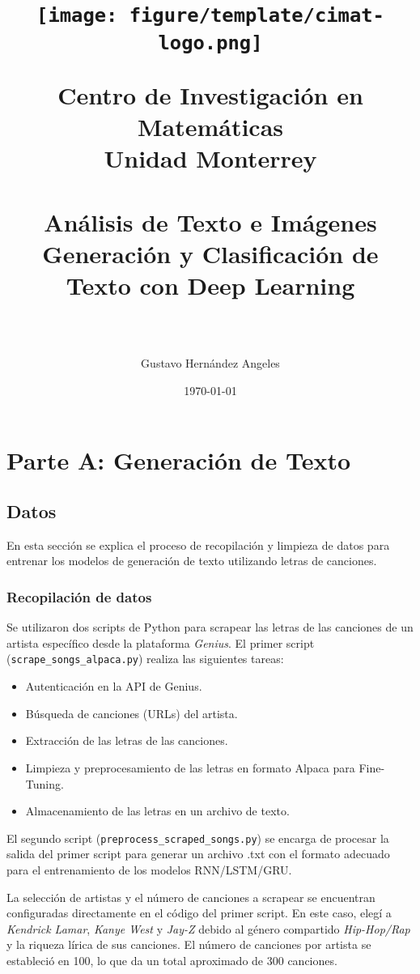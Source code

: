 \documentclass[paper=letter, fontsize=11pt, draft=false]{scrartcl}
\title{	
    \begin{center}
        \texttt{[image: figure/template/cimat-logo.png]} %
    \end{center}
    \vspace{0.5cm}
    \normalfont \normalsize 
    \textbf{\Large   Centro de Investigación en Matemáticas} \\
    \Large Unidad Monterrey \\ [25pt] 
    \horrule{1pt} \\[0.4cm] %
    \huge Análisis de Texto e Imágenes\\
    \Large Generación y Clasificación de Texto con Deep Learning\\ 
    \horrule{2pt} \\[0.5cm] %
}
\author{\large Gustavo Hernández Angeles}
\date{\normalsize\today} %
\numberwithin{equation}{section} %
\numberwithin{figure}{section} %
\numberwithin{table}{section} %
\numberwithin{subsection}{section}
\begin{document}
\maketitle %
\thispagestyle{empty}
\newpage

\tableofcontents
\newpage



\section{Parte A: Generación de Texto}

\subsection{Datos}

En esta sección se explica el proceso de recopilación y limpieza de datos para entrenar los modelos de generación de texto utilizando letras de canciones.

\subsubsection{Recopilación de datos}

Se utilizaron dos scripts de Python para scrapear las letras de las canciones de un artista específico desde la plataforma \textit{Genius}. El primer script (\texttt{scrape\_songs\_alpaca.py}) realiza las siguientes tareas:

\begin{itemize}
    \item Autenticación en la API de Genius.
    \item Búsqueda de canciones (URLs) del artista.
    \item Extracción de las letras de las canciones.
    \item Limpieza y preprocesamiento de las letras en formato Alpaca para Fine-Tuning.
    \item Almacenamiento de las letras en un archivo de texto.
\end{itemize}

El segundo script (\texttt{preprocess\_scraped\_songs.py}) se encarga de procesar la salida del primer script para generar un archivo .txt con el formato adecuado para el entrenamiento de los modelos RNN/LSTM/GRU.

La selección de artistas y el número de canciones a scrapear se encuentran configuradas directamente en el código del primer script. En este caso, elegí a \textit{Kendrick Lamar}, \textit{Kanye West} y \textit{Jay-Z} debido al género compartido \textit{Hip-Hop/Rap} y la riqueza lírica de sus canciones. El número de canciones por artista se estableció en 100, lo que da un total aproximado de 300 canciones.
\end{document}
